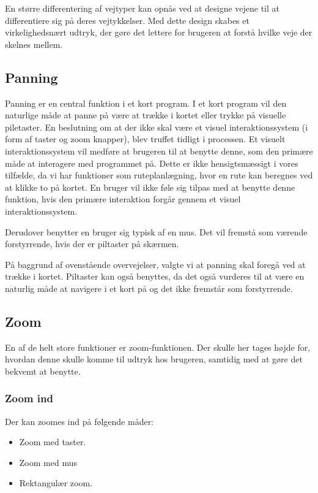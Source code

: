 En større differentering af vejtyper kan opnås ved at designe vejene til at differentiere sig på deres vejtykkelser. Med dette design skabes et virkelighedsnært udtryk, der gøre det lettere for brugeren at forstå hvilke veje der skelnes mellem.  


\subsection{Panning}

Panning er en central funktion i et kort program. I et kort program vil den naturlige måde at panne på være at trække i kortet eller trykke på visuelle piletaster. En beslutning om at der ikke skal være et visuel interaktionssystem (i form af taster og zoom knapper), blev truffet tidligt i processen. Et visuelt interaktionssystem vil medføre at brugeren til at benytte denne, som den primære måde at interagere med programmet på. Dette er ikke hensigtsmæssigt i vores tilfælde, da vi har funktioner som ruteplanlægning, hvor en rute kan beregnes ved at klikke to på kortet. En bruger vil ikke føle sig tilpas med at benytte denne funktion, hvis den primære interaktion forgår gennem et visuel interaktionssystem. 

Derudover benytter en bruger sig typisk af en mus. Det vil fremstå som værende forstyrrende, hvis der er piltaster på skærmen.  

På baggrund af ovenstående overvejelser, valgte vi at panning skal foregå ved at trække i kortet. Piltaster kan også benyttes, da det også vurderes til at være en naturlig måde at navigere i et kort på og det ikke fremstår som forstyrrende. 


\subsection{Zoom}
En af de helt store funktioner er zoom-funktionen. Der skulle her tages højde for, hvordan denne skulle komme til udtryk hos brugeren, samtidig med at gøre det bekvemt at benytte.  

\subsubsection{Zoom ind}

Der kan zoomes ind på følgende måder:

\begin{itemize}
	\item Zoom med taster.
	\item Zoom med mus
	\item Rektangulær zoom.
\end{itemize}

